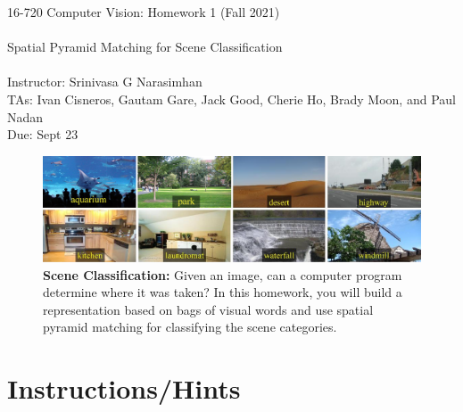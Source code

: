 \documentclass[10pt]{article}
\begin{document}
\begin{center}
    {\LARGE 16-720 Computer Vision: Homework 1 (Fall 2021)} \\
    ~ \\
    {\LARGE Spatial Pyramid Matching for Scene Classification} \\
    ~ \\ 
  Instructor: Srinivasa G Narasimhan\\
  TAs: Ivan Cisneros, Gautam Gare, Jack Good, Cherie Ho, Brady Moon, and Paul Nadan\\
    { Due: Sept 23 } \\
\end{center}

\begin{figure}[h]
\centering
\includegraphics[width=\textwidth]{figures/teaser/teaser.png}
\caption{{\bf Scene Classification:} Given an image, can a computer program determine where it was taken? In this homework, you will build a representation based on bags of visual words and use spatial pyramid matching for classifying the scene categories.}
\label{fig:teaser}
\end{figure}

\section*{Instructions/Hints}
\end{document}
